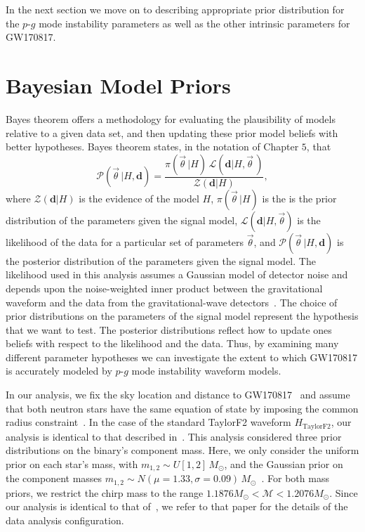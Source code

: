 In the next section we move on to describing appropriate prior distribution for the $p$-$g$ mode instability parameters as well as the other intrinsic parameters for GW170817.

\section{Bayesian Model Priors} \label{sec:priors}
Bayes theorem offers a methodology for evaluating the plausibility of models relative to a given data set, and then updating these prior model beliefs with better hypotheses. Bayes theorem states, in the notation of Chapter $5$, that
\begin{equation}
\mathcal{P}\left(\vec{\theta}\,| H, \mathbf{d}\right) = \frac{\pi\left(\vec{\theta}\,|H\right) \, \mathcal{L}\left(\mathbf{d}|H, \vec{\theta}\,\right)}{\mathcal{Z}\left(\mathbf{d}|H\right)},
\label{eq:bayestheorem}
\end{equation}
where $\mathcal{Z} \left(\mathbf{d}|H \right)$ is the evidence of the model $H$, $\pi \left(\vec{\theta}\,|H\right)$ is the is the prior distribution of the parameters given the signal model, $\mathcal{L}\left(\mathbf{d}|H, \vec{\theta}\right)$ is the likelihood of the data for a particular set of parameters $\vec{\theta}$, and $\mathcal{P}\left( \vec{\theta}\,|H, \mathbf{d}\right)$ is the posterior distribution of the parameters given the signal model. The likelihood used in this analysis assumes a Gaussian model of detector noise and depends upon the noise-weighted inner product between the gravitational waveform and the data from the gravitational-wave detectors~\citep{Finn:2000hj,Rover:2006bb}. The choice of prior distributions on the parameters of the signal model represent the hypothesis that we want to test. The posterior distributions reflect how to update ones beliefs with respect to the likelihood and the data. Thus, by examining many different parameter hypotheses we can investigate the extent to which GW170817 is accurately modeled by $p$-$g$ mode instability waveform models.

In our analysis, we fix the sky location and distance to GW170817~\citep{Soares-Santos:2017lru,Cantiello:2018ffy} and assume that both neutron stars have the same equation of state by imposing the common radius constraint~\citep{de2018tidal}. In the case of the standard TaylorF2 waveform $H_\mathrm{TaylorF2}$, our analysis is identical to that described in~\cite{de2018tidal}. This analysis considered three prior distributions on the binary's component mass. Here, we only consider the uniform prior on each star's mass, with $m_{1,2} \sim U[1,2]\, M_\odot$, and the Gaussian prior on the component masses $m_{1,2} \sim N(\mu = 1.33, \sigma = 0.09)\, M_\odot$~\citep{Ozel:2016oaf}. For both mass priors, we restrict the chirp mass to the range $ 1.1876 M_\odot < \mathcal{M} < 1.2076 M_\odot$. Since our analysis is identical to that of~\citep{de2018tidal}, we refer to that paper for the details of the data analysis configuration.

